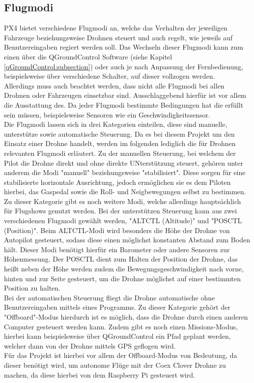 \subsection{Flugmodi}
PX4 bietet verschiedene Flugmodi an, welche das Verhalten der jeweiligen Fahrzeuge beziehungsweise Drohnen steuert und auch regelt, wie jeweils auf Benutzereingaben regiert werden soll. Das Wechseln dieser Flugmodi kann zum einen über die QGroundControl Software (siehe Kapitel \ref{qGroundControl:subsection}) oder auch je nach Anpassung der Fernbedienung, beispielsweise über verschiedene Schalter, auf dieser vollzogen werden. \\
Allerdings muss auch beachtet werden, dass nicht alle Flugmodi bei allen Drohnen oder Fahrzeugen einsetzbar sind. Ausschlaggebend hierfür ist vor allem die Ausstattung des. Da jeder Flugmodi bestimmte Bedingungen hat die erfüllt sein müssen, beispielsweise Sensoren wie ein Geschwindigkeitssensor. \\
Die Flugmodi lassen sich in drei Kategorien einteilen, diese sind manuelle, unterstütze sowie automatische Steuerung.
Da es bei diesem Projekt um den Einsatz einer Drohne handelt, werden im folgenden lediglich die für Drohnen relevanten Flugmodi erläutert.
Zu der manuellen Steuerung, bei welchem der Pilot die Drohne direkt und ohne direkte UNterstützung steuert, gehören unter anderem die Modi "manuell" beziehungsweise "stabilisiert". Diese sorgen für eine stabilisierte horizontale Ausrichtung, jedoch ermöglichen sie es dem Piloten hierbei, das Gaspedal sowie die Roll- und Neigbewegungen selbst zu bestimmen. Zu dieser Kategorie gibt es noch weitere Modi, welche allerdings hauptsächlich für Flugshows genutzt werden.
Bei der unterstützen Steuerung kann aus zwei verschiedenen Flugmodi gewählt werden, "ALTCTL (Altitude)" und "POSCTL (Position)". Beim ALTCTL-Modi wird besonders die Höhe der Drohne von Autopilot gesteuert, sodass diese einen möglichst konstanten Abstand zum Boden hält. Dieser Modi benötigt hierfür ein Barometer oder andere Sensoren zur Höhenmessung.
Der POSCTL dient zum Halten der Position der Drohne, das heißt neben der Höhe werden zudem die Bewegungsgeschwindigkeit nach vorne, hinten und zur Seite gesteuert, um die Drohne möglichst auf einer bestimmten Position zu halten.\\
Bei der automatischen Steuerung fliegt die Drohne automatische ohne Benutzereingaben mittels eines Programms. Zu dieser Kategorie gehört der "Offboard"-Modus hierdurch ist es möglich, dass die Drohne durch einen anderen Computer gesteuert werden kann. Zudem gibt es noch einen Missions-Modus, hierbei kann beispielsweise über QGroundControl ein Pfad geplant werden, welcher dann von der Drohne mittels GPS geflogen wird. \\
Für das Projekt ist hierbei vor allem der Offboard-Modus von Bedeutung, da dieser benötigt wird, um autonome Flüge mit der Coex Clover Drohne zu machen, da diese hierbei von dem Raspberry Pi gesteuert wird. \cite[vgl.][]{flight-modes}


